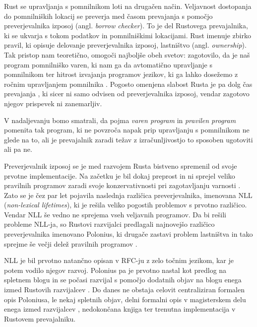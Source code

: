 \documentclass[a4paper,12pt,openright]{book}
\newcommand{\angl}[1]{(angl. \textit{#1})}
\begin{document}
Rust se upravljanja s pomnilnikom loti na drugačen način. Veljavnost dostopanja do pomnilniških lokacij se preverja med časom prevajanja s pomočjo preverjevalnika izposoj \angl{borrow checker}. To je del Rustovega prevajalnika, ki se ukvarja s tokom podatkov in pomnilniškimi lokacijami. Rust imenuje zbirko pravil, ki opisuje delovanje preverjevalnika izposoj, lastništvo \angl{ownership}. Tak pristop nam teoretično, omogoči najboljše obeh svetov: zagotovilo, da je naš program pomnilniško varen, ki nam ga da avtomatično upravljanje s pomnilnikom ter hitrost izvajanja programov jezikov, ki ga lahko dosežemo z ročnim upravljanjem pomnilnika \cite{klabnikRustProgrammingLanguage2023}. Pogosto omenjena slabost Rusta je pa dolg čas prevajanja \cite{glazarCodingRustBad2023}, ki sicer ni samo odvisen od preverjevalnika izposoj, vendar zagotovo njegov prispevek ni zanemarljiv.

V nadaljevanju bomo smatrali, da pojma \textit{varen program} in \textit{pravilen program} pomenita tak program, ki ne povzroča napak prip upravljanju s pomnilnikom ne glede na to, ali je prevajalnik zaradi težav z izračunljivostjo to sposoben ugotoviti ali pa ne.

Preverjevalnik izposoj se je med razvojem Rusta bistveno spremenil od svoje prvotne implementacije. Na začetku je bil dokaj preprost in ni sprejel veliko pravilnih programov zaradi svoje konzervativnosti pri zagotavljanju varnosti \cite{2094nllRustRFC}. Zato se je čez par let pojavila naslednja različica preverjevalnika, imenovana NLL (\textit{non-lexical lifetimes}), ki je rešila veliko pogostih problemov s prvotno različico. Vendar NLL še vedno ne sprejema vseh veljavnih programov. Da bi rešili probleme NLL-ja, so Rustovi razvijalci predlagali najnovejšo različico preverjevalnika imenovano Polonius, ki drugače zastavi problem lastništva in tako sprejme še večji delež pravilnih programov \cite{AliasbasedFormulationBorrow}.

NLL je bil prvotno natančno opisan v RFC-ju z zelo točnim jezikom, kar je potem vodilo njegov razvoj. Polonius pa je prvotno nastal kot predlog na spletnem blogu in se počasi razvijal s pomočjo dodatnih objav na blogu enega izmed Rustovih razvijalcev \cite{PoloniusRevisitedParta,PoloniusRevisitedPart,WhatPoloniusPolonius}. Do danes ne obstaja celovit centraliziran formalen opis Poloniusa, le nekaj spletnih objav, delni formalni opis v magisterskem delu enega izmed razvijalcev \cite{stjernaModellingRustsReference}, nedokončana knjiga \cite{WhatPoloniusPolonius} ter trenutna implementacija v Rustovem prevajalniku.
\end{document}
